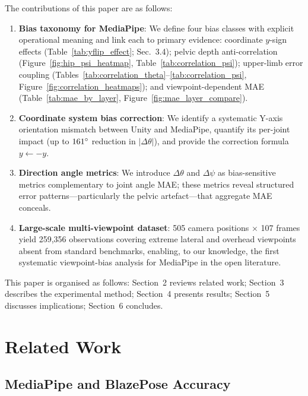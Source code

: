 \documentclass[twocolumn]{article}
\begin{document}
The contributions of this paper are as follows:
\begin{enumerate}\itemsep0pt
  \item \textbf{Bias taxonomy for MediaPipe}: We define four bias classes
        with explicit operational meaning and link each to primary evidence:
        coordinate $y$-sign effects (Table~\ref{tab:yflip_effect};
        Sec.~3.4); pelvic depth anti-correlation
        (Figure~\ref{fig:hip_psi_heatmap}, Table~\ref{tab:correlation_psi});
        upper-limb error coupling
        (Tables~\ref{tab:correlation_theta}--\ref{tab:correlation_psi},
        Figure~\ref{fig:correlation_heatmaps}); and viewpoint-dependent MAE
        (Table~\ref{tab:mae_by_layer}, Figure~\ref{fig:mae_layer_compare}).
  \item \textbf{Coordinate system bias correction}: We identify a
        systematic Y-axis orientation mismatch between Unity and MediaPipe,
        quantify its per-joint impact (up to $161\degree{}$ reduction in
        $|\Delta\theta|$), and provide the correction formula
        $y \leftarrow -y$.
  \item \textbf{Direction angle metrics}: We introduce $\Delta\theta$ and
        $\Delta\psi$ as bias-sensitive metrics complementary to joint angle
        MAE; these metrics reveal structured error patterns---particularly
        the pelvic artefact---that aggregate MAE conceals.
  \item \textbf{Large-scale multi-viewpoint dataset}: 505 camera positions
        $\times$ 107 frames yield 259,356 observations covering extreme
        lateral and overhead viewpoints absent from standard benchmarks,
        enabling, to our knowledge, the first systematic viewpoint-bias analysis
        for MediaPipe in the open literature.
\end{enumerate}

This paper is organised as follows:
Section~2 reviews related work;
Section~3 describes the experimental method;
Section~4 presents results;
Section~5 discusses implications;
Section~6 concludes.

\section{Related Work}

\subsection{MediaPipe and BlazePose Accuracy}
\end{document}
